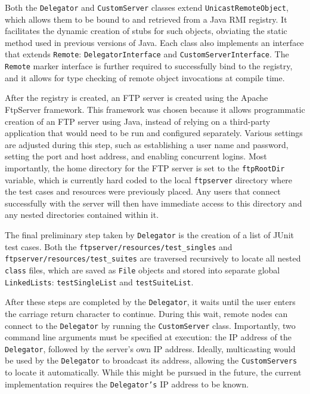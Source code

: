 \documentclass{article}
\begin{document}
{Both the \texttt{Delegator} and \texttt{CustomServer} classes extend \texttt{UnicastRemoteObject}, which allows them to be bound to and retrieved from a Java RMI registry.  It facilitates the dynamic creation of stubs for such objects, obviating the static method used in previous versions of Java.  Each class also implements an interface that extends \texttt{Remote}: \texttt{DelegatorInterface} and \texttt{CustomServerInterface}.  The \texttt{Remote} marker interface is further required to successfully bind to the registry, and it allows for type checking of remote object invocations at compile time.

After the registry is created, an FTP server is created using the Apache FtpServer framework.  This framework was chosen because it allows programmatic creation of an FTP server using Java, instead of relying on a third-party application that would need to be run and configured separately.  Various settings are adjusted during this step, such as establishing a user name and password, setting the port and host address, and enabling concurrent logins.  Most importantly, the home directory for the FTP server is set to the \texttt{ftpRootDir} variable, which is currently hard coded to the local \texttt{ftpserver} directory where the test cases and resources were previously placed.  Any users that connect successfully with the server will then have immediate access to this directory and any nested directories contained within it.

The final preliminary step taken by \texttt{Delegator} is the creation of a list of JUnit test cases.  Both the \texttt{ftpserver/resources/test\_singles} and \texttt{ftpserver/resources/test\_suites} are traversed recursively to locate all nested \texttt{class} files, which are saved as \texttt{File} objects and stored into separate global \texttt{LinkedLists}: \texttt{testSingleList} and \texttt{testSuiteList}.

After these steps are completed by the \texttt{Delegator}, it waits until the user enters the carriage return character to continue.  During this wait, remote nodes can connect to the \texttt{Delegator} by running the \texttt{CustomServer} class.  Importantly, two command line arguments must be specified at execution: the IP address of the \texttt{Delegator}, followed by the server's own IP address.  Ideally, multicasting would be used by the \texttt{Delegator} to broadcast its address, allowing the \texttt{CustomServers} to locate it automatically.  While this might be pursued in the future, the current implementation requires the \texttt{Delegator's} IP address to be known.  

}
\end{document}
